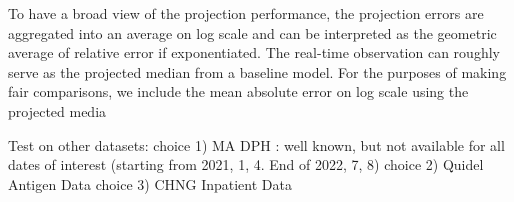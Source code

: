 To have a broad view of the projection performance, the projection errors are aggregated into an average on log scale and can be interpreted as the geometric average of relative error if exponentiated. The real-time observation can roughly serve as the projected median from a baseline model. For the purposes of making fair comparisons, we include the mean absolute error on log scale using the projected media




Test on other datasets:
choice 1) MA DPH : well known, but not available for all dates of interest (starting from 2021, 1, 4. End of 2022, 7, 8)
choice 2) Quidel Antigen Data
choice 3) CHNG Inpatient Data



